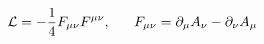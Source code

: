 \begin{equation}
{\cal{L}} = -\frac{1}{4}F_{\mu \nu }F^{\mu \nu }, ~~~~~F_{\mu \nu } =
\partial_\mu A_\nu - \partial_\nu A_\mu
\label{7}
\end{equation}

